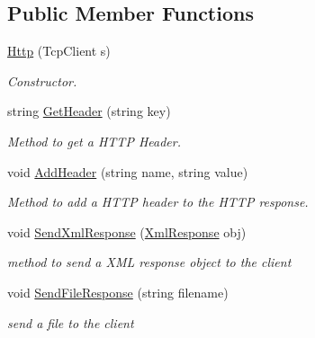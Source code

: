 \subsection*{Public Member Functions}
\begin{DoxyCompactItemize}
\item 
\hyperlink{class_damp_server_1_1_http_a09ded9756839479231daff2b0055a2a5}{Http} (Tcp\-Client s)
\begin{DoxyCompactList}\small\item\em Constructor. \end{DoxyCompactList}\item 
string \hyperlink{class_damp_server_1_1_http_ac816f6ae707b72a4e7df4a34f899968e}{Get\-Header} (string key)
\begin{DoxyCompactList}\small\item\em Method to get a H\-T\-T\-P Header. \end{DoxyCompactList}\item 
void \hyperlink{class_damp_server_1_1_http_affa878d115df40b55ffc4c8836757fe0}{Add\-Header} (string name, string value)
\begin{DoxyCompactList}\small\item\em Method to add a H\-T\-T\-P header to the H\-T\-T\-P response. \end{DoxyCompactList}\item 
void \hyperlink{class_damp_server_1_1_http_a0abfbc49b956c9f3c0a55a6f91121f85}{Send\-Xml\-Response} (\hyperlink{class_damp_server_1_1_xml_response}{Xml\-Response} obj)
\begin{DoxyCompactList}\small\item\em method to send a X\-M\-L response object to the client \end{DoxyCompactList}\item 
void \hyperlink{class_damp_server_1_1_http_a5d170a7d40519f9837e8c41592ab0155}{Send\-File\-Response} (string filename)
\begin{DoxyCompactList}\small\item\em send a file to the client \end{DoxyCompactList}\end{DoxyCompactItemize}
